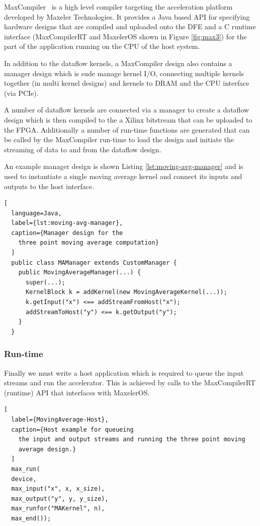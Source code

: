\label{sec:back--maxcompiler}

MaxCompiler~\cite{5719584} is a high level compiler targeting the
acceleration platform developed by Maxeler Technologies. It provides a
Java based API for specifying hardware designs that are compiled and
uploaded onto the DFE and a C runtime interface (MaxCompilerRT and
MaxelerOS shown in Figure \ref{fig:max3}) for the part of the
application running on the CPU of the host system.

In addition to the dataflow kernels, a MaxCompiler design also
contains a manager design which is sude manage kernel I/O, connecting
multiple kernels together (in multi kernel designs) and kernels to
DRAM and the CPU interface (via PCIe).

A number of dataflow kernels are connected via a manager to create a
dataflow design which is then compiled to the a Xilinx bitstream that
can be uploaded to the FPGA. Additionally a number of run-time
functions are generated that can be called by the MaxCompiler run-time
to load the design and initiate the streaming of data to and from the
dataflow design.

An example manager design is shown Listing
\ref{lst:moving-avg-manager} and is used to instantiate a single
moving average kernel and connect its inputs and outputs to the host
interface.

\begin{lstlisting}[
  language=Java,
  label={lst:moving-avg-manager},
  caption={Manager design for the
    three point moving average computation}
  ]
  public class MAManager extends CustomManager {
    public MovingAverageManager(...) {
      super(...);
      KernelBlock k = addKernel(new MovingAverageKernel(...));
      k.getInput("x") <== addStreamFromHost("x");
      addStreamToHost("y") <== k.getOutput("y");
    }
  }
\end{lstlisting}

\subsubsection{Run-time}
Finally we must write a host application which is required to queue
the input streams and run the accelerator. This is achieved by calls
to the MaxCompilerRT (runtime) API that interfaces with MaxelerOS.

\begin{lstlisting}[
  label={MovingAverage-Host},
  caption={Host example for queueing
    the input and output streams and running the three point moving
    average design.}
  ]
  max_run(
  device,
  max_input("x", x, x_size),
  max_output("y", y, y_size),
  max_runfor("MAKernel", n),
  max_end());
\end{lstlisting}


